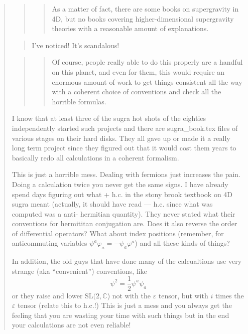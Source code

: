 \documentclass{article}
\begin{document}
\begin{quote}
\begin{quote}
\begin{quote}
As a matter of fact, there are some books on supergravity in 4D, but no
books covering higher-dimensional supergravity theories with a
reasonable amount of explanations.
\end{quote}
\end{quote}

\begin{quote}
I've noticed! It's scandalous!
\end{quote}

\begin{quote}
\begin{quote}
Of course, people really able to do this properly are a handful on this
planet, and even for them, this would require an enormous amount of work
to get things consistent all the way with a coherent choice of
conventions and check all the horrible formulas.
\end{quote}
\end{quote}

I know that at least three of the sugra hot shots of the eighties
independently started such projects and there are sugra\_book.tex files
of various stages on their hard disks. They all gave up or made it a
really long term project since they figured out that it would cost them
years to basically redo all calculations in a coherent formalism.

This is just a horrible mess. Dealing with fermions just increases the
pain. Doing a calculation twice you never get the same signs. I have
already spend days figuring out what + h.c. in the stony brook textbook
on 4D sugra meant (actually, it should have read --- h.c. since what was
computed was a anti- hermitian quantity). They never stated what their
conventions for hermititan conjugation are. Does it also reverse the
order of differential operators? What about index positions (remember,
for anticommuting variables \(\psi^a \varphi_a = - \psi_a \varphi^a\))
and all these kinds of things?

In addition, the old guys that have done many of the calcualtions use
very strange (aka ``convenient'') conventions, like
\[\psi^2 = \frac12 \psi^a \psi_a\] or they raise and lower
\(\mathrm{SL}(2,\mathbb{C}\)) not with the \(\varepsilon\) tensor, but
with \(i\) times the \(\varepsilon\) tensor (relate this to h.c.!) This
is just a mess and you always get the feeling that you are wasting your
time with such things but in the end your calculations are not even
reliable!


\end{quote}
\end{document}
